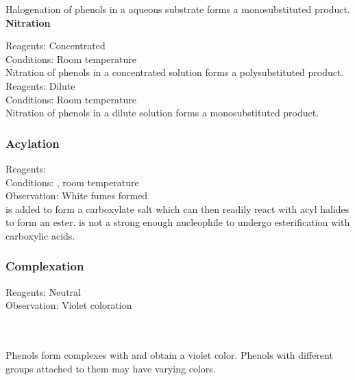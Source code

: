 \documentclass[../main]{subfiles}
\begin{document}
	Halogenation of phenols in a aqueous substrate forms a monosubstituted product. \\

	\noindent \textbf{Nitration}

	Reagents: Concentrated  \\
	Conditions: Room temperature\\

	Nitration of phenols in a concentrated solution forms a polysubstituted product. \\

	Reagents: Dilute  \\
	Conditions: Room temperature\\

	Nitration of phenols in a dilute solution forms a monosubstituted product. \\

	\subsubsection{Acylation}

	Reagents:  \\
	Conditions: , room temperature \\
	Observation: White fumes formed  \\

	 is added to form a carboxylate salt which can then readily react with acyl halides to form an ester.  is not a strong enough nucleophile to undergo esterification with carboxylic acids. \\

	\subsubsection{Complexation}

	Reagents: Neutral  \\
	Observation: Violet coloration \\

	 \\
	 \\

	\vspace{12pt}

	Phenols form complexes with  and obtain a violet color. Phenols with different groups attached to them may have varying colors.

	
\end{document}
